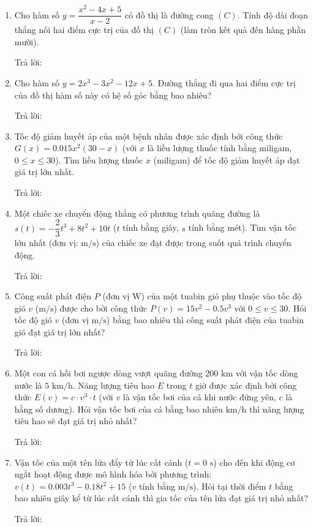 \documentclass[12pt]{article}
\newcommand{\otraloi}{\underline{\hspace{5cm}}}
\begin{document}
\begin{enumerate}[label=\textbf{Câu \arabic*.}]
		\item Cho hàm số $y = \dfrac{x^2 - 4x + 5}{x - 2}$ có đồ thị là đường cong $(C)$. Tính độ dài đoạn thẳng nối hai điểm cực trị của đồ thị $(C)$ (làm tròn kết quả đến hàng phần mười).
		\par Trả lời: \otraloi
		
		\item Cho hàm số $y = 2x^3 - 3x^2 - 12x + 5$. Đường thẳng đi qua hai điểm cực trị của đồ thị hàm số này có hệ số góc bằng bao nhiêu?
		\par Trả lời: \otraloi
		
		
		\item Tốc độ giảm huyết áp của một bệnh nhân được xác định bởi công thức $G(x) = 0.015x^2(30 - x)$ (với $x$ là liều lượng thuốc tính bằng miligam, $0 \le x \le 30$). Tìm liều lượng thuốc $x$ (miligam) để tốc độ giảm huyết áp đạt giá trị lớn nhất.
		\par Trả lời: \otraloi
		
		\item Một chiếc xe chuyển động thẳng có phương trình quãng đường là $s(t) = -\dfrac{2}{3}t^3 + 8t^2 + 10t$ ($t$ tính bằng giây, $s$ tính bằng mét). Tìm vận tốc lớn nhất (đơn vị: $\text{m/s}$) của chiếc xe đạt được trong suốt quá trình chuyển động.
		\par Trả lời: \otraloi
		
		\item Công suất phát điện $P$ (đơn vị $\text{W}$) của một tuabin gió phụ thuộc vào tốc độ gió $v$ ($\text{m/s}$) được cho bởi công thức $P(v) = 15v^2 - 0.5v^3$ với $0 \le v \le 30$. Hỏi tốc độ gió $v$ (đơn vị $\text{m/s}$) bằng bao nhiêu thì công suất phát điện của tuabin gió đạt giá trị lớn nhất?
		\par Trả lời: \otraloi
		
		\item Một con cá hồi bơi ngược dòng vượt quãng đường $200\text{ km}$ với vận tốc dòng nước là $5\text{ km/h}$. Năng lượng tiêu hao $E$ trong $t$ giờ được xác định bởi công thức $E(v) = c \cdot v^3 \cdot t$ (với $v$ là vận tốc bơi của cá khi nước đứng yên, $c$ là hằng số dương). Hỏi vận tốc bơi của cá bằng bao nhiêu $\text{km/h}$ thì năng lượng tiêu hao sẽ đạt giá trị nhỏ nhất?
		\par Trả lời: \otraloi
		
		\item Vận tốc của một tên lửa đẩy từ lúc cất cánh ($t = 0\text{ s}$) cho đến khi động cơ ngắt hoạt động được mô hình hóa bởi phương trình: $v(t) = 0.003t^3 - 0.18t^2 + 15$ ($v$ tính bằng $\text{m/s}$). Hỏi tại thời điểm $t$ bằng bao nhiêu giây kể từ lúc cất cánh thì gia tốc của tên lửa đạt giá trị nhỏ nhất?
		\par Trả lời: \otraloi
		
	\end{enumerate}
	
\end{document}

